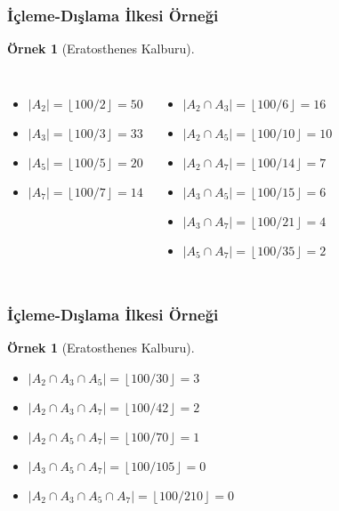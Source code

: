 \documentclass[dvipsnames]{beamer}
\theoremstyle{definition}
\theoremstyle{example}
\newtheorem{ornek}[theorem]{Örnek}
\theoremstyle{plain}
\begin{document}
\begin{frame}
  \frametitle{İçleme-Dışlama İlkesi Örneği}

  \begin{ornek}[Eratosthenes Kalburu]
    \begin{columns}[t]
      \begin{itemize}
        \item $|A_2| = \left\lfloor 100/2 \right\rfloor = 50$
        \item $|A_3| = \left\lfloor 100/3 \right\rfloor = 33$
        \item $|A_5| = \left\lfloor 100/5 \right\rfloor = 20$
        \item $|A_7| = \left\lfloor 100/7 \right\rfloor = 14$
      \end{itemize}

      \pause
      \begin{itemize}
        \item $|A_2 \cap A_3| = \left\lfloor 100/6  \right\rfloor = 16$
        \item $|A_2 \cap A_5| = \left\lfloor 100/10 \right\rfloor = 10$
        \item $|A_2 \cap A_7| = \left\lfloor 100/14 \right\rfloor = 7$
        \item $|A_3 \cap A_5| = \left\lfloor 100/15 \right\rfloor = 6$
        \item $|A_3 \cap A_7| = \left\lfloor 100/21 \right\rfloor = 4$
        \item $|A_5 \cap A_7| = \left\lfloor 100/35 \right\rfloor = 2$
      \end{itemize}
    \end{columns}
  \end{ornek}
\end{frame}

\begin{frame}
  \frametitle{İçleme-Dışlama İlkesi Örneği}

  \begin{ornek}[Eratosthenes Kalburu]
    \begin{itemize}
      \item $|A_2 \cap A_3 \cap A_5| = \left\lfloor 100/30  \right\rfloor = 3$
      \item $|A_2 \cap A_3 \cap A_7| = \left\lfloor 100/42  \right\rfloor = 2$
      \item $|A_2 \cap A_5 \cap A_7| = \left\lfloor 100/70  \right\rfloor = 1$
      \item $|A_3 \cap A_5 \cap A_7| = \left\lfloor 100/105 \right\rfloor = 0$
    \end{itemize}

    \pause
    \begin{itemize}
      \item $|A_2 \cap A_3 \cap A_5 \cap A_7| = \left\lfloor 100/210 \right\rfloor = 0$
    \end{itemize}
  \end{ornek}
\end{frame}
\end{document}
